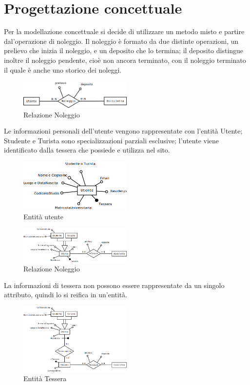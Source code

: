 \documentclass[a4paper,twoside]{article}
\begin{document}
\section{Progettazione concettuale}
Per la modellazione concettuale si decide di utilizzare un metodo misto e partire dal'operazione di noleggio.\newline
Il noleggio è formato da due distinte operazioni, un prelievo che inizia il noleggio, e un deposito che lo termina; il deposito distingue inoltre il noleggio pendente, cioè non ancora terminato, con il noleggio terminato il quale è anche uno storico dei noleggi.
\begin{figure}[H]
 \centering
  \includegraphics[width=0.5\textwidth]{Immagini-Grafici/Concettuale01.png}
\caption{Relazione Noleggio}
\end{figure}
Le informazioni personali dell'utente vengono rappresentate con l'entità Utente; Studente e Turista sono specializzazioni parziali esclusive; l'utente viene identificato dalla tessera che possiede e utilizza nel sito.
\begin{figure}[H]
 \centering
  \includegraphics[width=0.5\textwidth]{Immagini-Grafici/Concettuale02.png}
\caption{Entità utente}
\end{figure}
\begin{figure}[H]
 \centering
  \includegraphics[width=0.5\textwidth]{Immagini-Grafici/Concettuale03.png}
\caption{Relazione Noleggio}
\end{figure}
La informazioni di tessera non possono essere rappresentate da un singolo attributo, quindi lo si reifica in un'entità.
\begin{figure}[H]
 \centering
  \includegraphics[width=0.5\textwidth]{Immagini-Grafici/Concettuale04.png}
\caption{Entità Tessera}
\end{figure}
\end{document}
